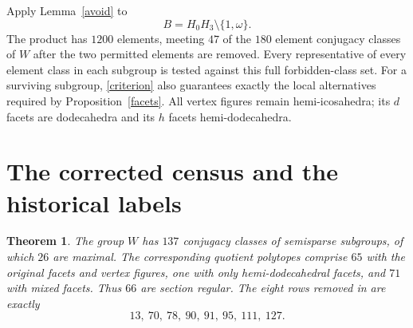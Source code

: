 \documentclass[11pt,a4paper]{article}
\newtheorem{theorem}{Theorem}\newtheorem{lemma}[theorem]{Lemma}\newtheorem{proposition}[theorem]{Proposition}
\begin{document}
Apply Lemma~\ref{avoid} to
\[
 B=H_0H_3\setminus\{1,\omega\}.
\]
The product has $1200$ elements, meeting $47$ of the $180$ element conjugacy classes of $W$ after the two permitted elements are removed. Every representative of every element class in each subgroup is tested against this full forbidden-class set. For a surviving subgroup, \eqref{criterion} also guarantees exactly the local alternatives required by Proposition~\ref{facets}. All vertex figures remain hemi-icosahedra; its $d$ facets are dodecahedra and its $h$ facets hemi-dodecahedra.

\section{The corrected census and the historical labels}
\begin{theorem}\label{census}
The group $W$ has $137$ conjugacy classes of semisparse subgroups, of which $26$ are maximal. The corresponding quotient polytopes comprise $65$ with the original facets and vertex figures, one with only hemi-dodecahedral facets, and $71$ with mixed facets. Thus $66$ are section regular. The eight rows removed in \cite{erratum} are exactly
\[
 13,\ 70,\ 78,\ 90,\ 91,\ 95,\ 111,\ 127.
\]
\end{theorem}
\end{document}
